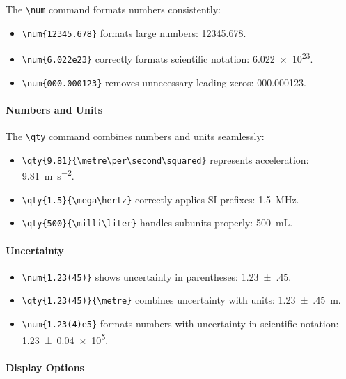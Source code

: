 The \verb|\num| command formats numbers consistently:
\begin{itemize}
    \item \verb|\num{12345.678}| formats large numbers: \num{12345.678}.
    \item \verb|\num{6.022e23}| correctly formats scientific notation: \num{6.022e23}.
    \item \verb|\num{000.000123}| removes unnecessary leading zeros: \num{000.000123}.
\end{itemize}

\paragraph*{Numbers and Units}

The \verb|\qty| command combines numbers and units seamlessly:
\begin{itemize}
    \item \verb|\qty{9.81}{\metre\per\second\squared}| represents acceleration: \qty{9.81}{\metre\per\second\squared}.
    \item \verb|\qty{1.5}{\mega\hertz}| correctly applies SI prefixes: \qty{1.5}{\mega\hertz}.
    \item \verb|\qty{500}{\milli\liter}| handles subunits properly: \qty{500}{\milli\liter}.
\end{itemize}

\paragraph*{Uncertainty}

\begin{itemize}
    \item \verb|\num{1.23(45)}| shows uncertainty in parentheses: \num{1.23(45)}.
    \item \verb|\qty{1.23(45)}{\metre}| combines uncertainty with units: \qty{1.23(45)}{\metre}.
    \item \verb|\num{1.23(4)e5}| formats numbers with uncertainty in scientific notation: \num{1.23(4)e5}.
\end{itemize}

\paragraph*{Display Options}

